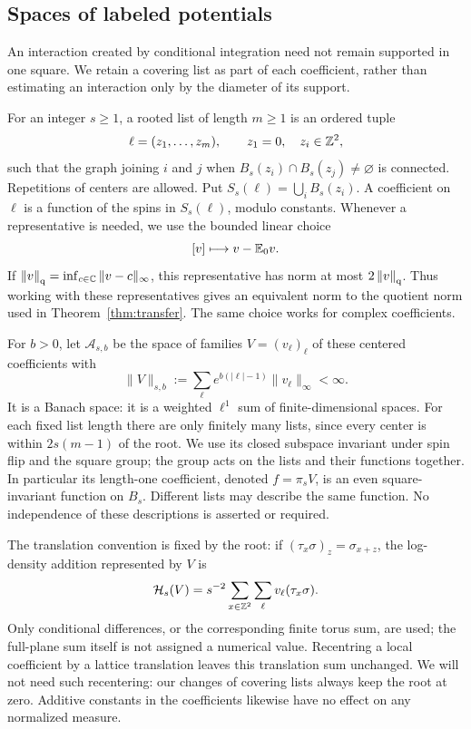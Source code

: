 \subsection{Spaces of labeled potentials}

An interaction created by conditional integration need not remain supported
in one square.  We retain a covering list as part of each coefficient, rather
than estimating an interaction only by the diameter of its support.

For an integer \(s\ge1\), a rooted list of length \(m\ge1\) is an ordered
tuple
\[
 \ell=(z_1,\ldots,z_m),\qquad z_1=0,\quad z_i\in\mathbb Z^2,
\]
such that the graph joining \(i\) and \(j\) when
\(B_s(z_i)\cap B_s(z_j)\ne\varnothing\) is connected.  Repetitions of
centers are allowed.  Put \(S_s(\ell)=\bigcup_iB_s(z_i)\).  A coefficient
on \(\ell\) is a function of the spins in \(S_s(\ell)\), modulo constants.
Whenever a representative is needed, we use the bounded linear choice
\[
 [v]\longmapsto v-\mathbb E_0v.
\]
If \(\left\|v\right\|_{\mathrm q}=\inf_{c\in\mathbb C}\|v-c\|_\infty\), this representative has
norm at most \(2\left\|v\right\|_{\mathrm q}\).  Thus working with these representatives gives
an equivalent norm to the quotient norm used in
Theorem~\ref{thm:transfer}.  The same choice works for complex coefficients.

For \(b>0\), let \(\mathcal A_{s,b}\) be the space of families
\(V=(v_\ell)_\ell\) of these centered coefficients with
\begin{equation}\label{eq:flow-list-norm}
 \|V\|_{s,b}:=\sum_\ell e^{b(|\ell|-1)}\|v_\ell\|_\infty<\infty.
\end{equation}
It is a Banach space: it is a weighted \(\ell^1\) sum of finite-dimensional
spaces.  For each fixed list length there are only finitely many lists,
since every center is within \(2s(m-1)\) of the root.  We use its closed
subspace invariant under spin flip and the square group; the group acts on
the lists and their functions together.  In particular its length-one
coefficient, denoted \(f=\pi_sV\), is an even square-invariant function on
\(B_s\).  Different lists may describe the same function.  No independence
of these descriptions is asserted or required.

The translation convention is fixed by the root: if
\((\tau_x\sigma)_z=\sigma_{x+z}\), the log-density addition represented by
\(V\) is
\begin{equation}\label{eq:flow-density}
 \mathcal H_s(V)=s^{-2}\sum_{x\in\mathbb Z^2}\sum_\ell
 v_\ell(\tau_x\sigma).
\end{equation}
Only conditional differences, or the corresponding finite torus sum, are
used; the full-plane sum itself is not assigned a numerical value.
Recentring a local coefficient by a lattice translation leaves this
translation sum unchanged.  We will not need such recentering: our changes
of covering lists always keep the root at zero.  Additive constants in the
coefficients likewise have no effect on any normalized measure.

